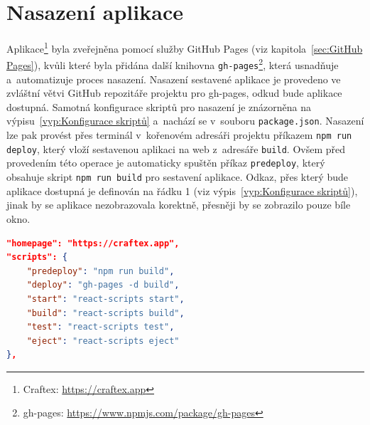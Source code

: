 \section{Nasazení aplikace}
\label{sec:Nasazení aplikace}
Aplikace\footnote{Craftex: \url{https://craftex.app}} byla zveřejněna pomocí služby GitHub Pages (viz kapitola~\ref{sec:GitHub Pages}), kvůli které byla přidána další knihovna \texttt{gh-pages}\footnote{gh-pages: \url{https://www.npmjs.com/package/gh-pages}}, která usnadňuje a~automatizuje proces nasazení. Nasazení sestavené aplikace je provedeno ve zvláštní větvi GitHub repozitáře projektu pro gh-pages, odkud bude aplikace dostupná. Samotná konfigurace skriptů pro nasazení je znázorněna na výpisu~\ref{vyp:Konfigurace skriptů} a~nachází se v~souboru \texttt{package.json}. Nasazení lze pak provést přes terminál v~kořenovém adresáři projektu příkazem \texttt{npm run deploy}, který vloží sestavenou aplikaci na web z~adresáře \texttt{build}. Ovšem před provedením této operace je automaticky spuštěn příkaz \texttt{predeploy}, který obsahuje skript \texttt{npm run build} pro sestavení aplikace. Odkaz, přes který bude aplikace dostupná je definován na řádku 1 (viz výpis~\ref{vyp:Konfigurace skriptů}), jinak by se aplikace nezobrazovala korektně, přesněji by se zobrazilo pouze bíle okno.


\begin{lstlisting}[language=json, caption={Konfigurace skriptů}, label={vyp:Konfigurace skriptů}]
"homepage": "https://craftex.app",
"scripts": {
    "predeploy": "npm run build",
    "deploy": "gh-pages -d build",
    "start": "react-scripts start",
    "build": "react-scripts build",
    "test": "react-scripts test",
    "eject": "react-scripts eject"
},
\end{lstlisting}

